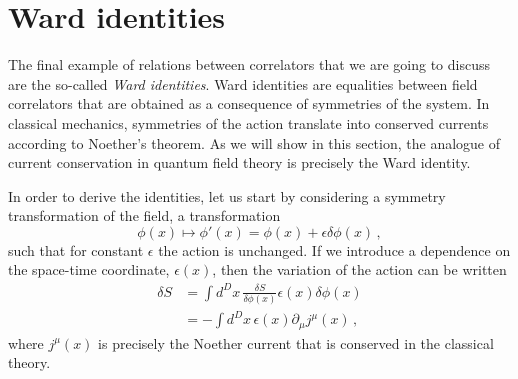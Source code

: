 \section{Ward identities}
\label{sec:ward-identities}

The final example of relations between correlators that we are going
to discuss are the so-called {\em Ward identities}. Ward identities
are equalities between field correlators that are obtained as a
consequence of symmetries of the system. In classical mechanics,
symmetries of the action translate into conserved currents according
to Noether's theorem. As we will show in this section, the analogue of
current conservation in quantum field theory is precisely the Ward
identity. 

In order to derive the identities, let us start by considering a
symmetry transformation of the field, \ie a transformation
\begin{equation}
  \label{eq:FieldTrans}
  \phi(x) \mapsto \phi'(x)=\phi(x) + \epsilon \delta\phi(x) \, ,
\end{equation}
such that for constant $\epsilon$ the action is unchanged. If we introduce
a dependence on the space-time coordinate, $\epsilon(x)$, then the
variation of the action can be written
\begin{align}
  \label{eq:SVar}
  \delta S &= \int d^Dx\, \frac{\delta S}{\delta\phi(x)} \epsilon(x)
             \delta\phi(x) \\
             &= -\int d^Dx\, \epsilon(x) \partial_\mu j^\mu(x)\, , 
\end{align}
where $j^\mu(x)$ is precisely the Noether current that is conserved in
the classical theory. 

